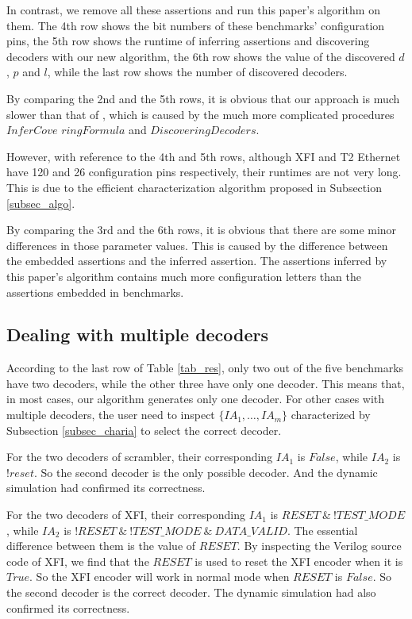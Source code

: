 \documentclass[journal]{IEEEtran}
\begin{document}
In contrast,
we remove all these assertions and run this paper's algorithm on them.
The 4th row shows the bit numbers of these benchmarks' configuration pins,
the 5th row shows the runtime of inferring assertions and discovering decoders with our new algorithm,
the 6th row shows the value of the discovered $d$, $p$ and $l$,
while the last row shows the number of discovered decoders.

By comparing the 2nd and the 5th rows,
it is obvious that our approach is much slower than that of \cite{ShengYuShen:tcad11},
which is caused by the much more complicated procedures $InferCove$ $ringFormula$ and $DiscoveringDecoders$.

However,
with reference to the 4th and 5th rows,
although XFI and T2 Ethernet have 120 and 26 configuration pins respectively,
their runtimes are not very long.
This is due to the efficient characterization algorithm proposed in Subsection \ref{subsec_algo}.

By comparing the 3rd and the 6th rows,
it is obvious that there are some minor differences in those parameter values.
This is caused by the difference between the embedded assertions and the inferred assertion.
The assertions inferred by this paper's algorithm contains much more configuration letters than the assertions embedded in benchmarks.



\subsection{Dealing with multiple decoders}\label{subsec_exp_muldec}
According to the last row of Table \ref{tab_res},
only two out of the five benchmarks have two decoders,
while the other three have only one decoder.
This means that,
in most cases,
our algorithm generates only one decoder.
For other cases with multiple decoders,
the user need to inspect $\{IA_1,\dots,IA_{m}\}$ characterized by Subsection \ref{subsec_charia} to select the correct decoder.

For the two decoders of scrambler,
their corresponding $IA_1$ is $False$,
while $IA_2$ is $!reset$.
So the second decoder is the only possible decoder.
And the dynamic simulation had confirmed its correctness.

For the two decoders of XFI,
their corresponding $IA_1$ is $RESET~\&~!TEST\_MODE$,
while $IA_2$ is $!RESET~\&~!TEST\_MODE~\&~DATA\_VALID$.
The essential difference between them is the value of $RESET$.
By inspecting the Verilog source code of XFI,
we find that the $RESET$ is used to reset the XFI encoder when it is $True$.
So the XFI encoder will work in normal mode when $RESET$ is $False$.
So the second decoder is the correct decoder.
The dynamic simulation had also confirmed its correctness.
\end{document}
